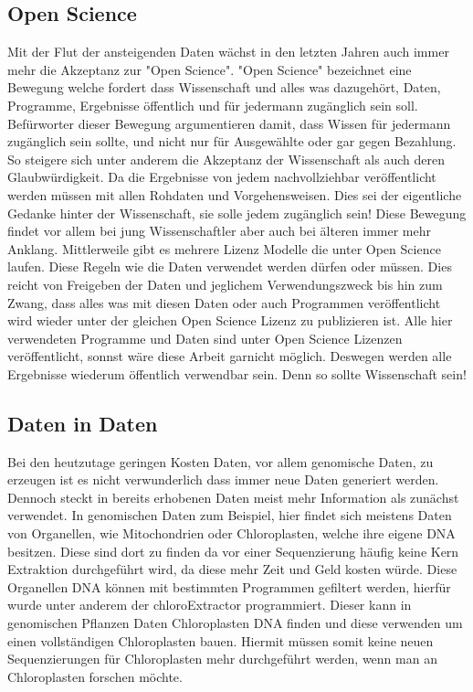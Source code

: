 \documentclass{scrartcl}
\begin{document}
\subsection{Open Science}
\label{sec-1-3}
Mit der Flut der ansteigenden Daten wächst in den letzten Jahren auch immer mehr die Akzeptanz zur "Open Science".
"Open Science" bezeichnet eine Bewegung welche fordert dass Wissenschaft und alles was dazugehört, Daten, Programme, Ergebnisse öffentlich und für jedermann 
zugänglich sein soll. Befürworter dieser Bewegung argumentieren damit, dass Wissen für jedermann zugänglich sein sollte, und nicht nur für Ausgewählte oder gar
gegen Bezahlung. So steigere sich unter anderem die Akzeptanz der Wissenschaft als auch deren Glaubwürdigkeit. Da die Ergebnisse von jedem nachvollziehbar 
veröffentlicht werden müssen mit allen Rohdaten und Vorgehensweisen. Dies sei der eigentliche Gedanke hinter der Wissenschaft, sie solle jedem zugänglich sein!
Diese Bewegung findet vor allem bei jung Wissenschaftler aber auch bei älteren immer mehr Anklang. Mittlerweile gibt es mehrere Lizenz Modelle die unter
Open Science laufen. Diese Regeln wie die Daten verwendet werden dürfen oder müssen. Dies reicht von Freigeben der Daten und jeglichem Verwendungszweck bis hin
zum Zwang, dass alles was mit diesen Daten oder auch Programmen veröffentlicht wird wieder unter der gleichen Open Science Lizenz zu publizieren ist.
Alle hier verwendeten Programme und Daten sind unter Open Science Lizenzen veröffentlicht, sonnst wäre diese Arbeit garnicht möglich. 
Deswegen werden alle Ergebnisse wiederum öffentlich verwendbar sein. Denn so sollte Wissenschaft sein!  

\subsection{Daten in Daten}
\label{sec-1-4}
Bei den heutzutage geringen Kosten Daten, vor allem genomische Daten, zu erzeugen ist es nicht verwunderlich dass immer neue Daten generiert werden.
Dennoch steckt in bereits erhobenen Daten meist mehr Information als zunächst verwendet. In genomischen Daten zum Beispiel, hier findet sich meistens Daten 
von Organellen, wie Mitochondrien oder Chloroplasten, welche ihre eigene DNA besitzen. Diese sind dort zu finden da vor einer Sequenzierung häufig keine 
Kern Extraktion durchgeführt wird, da diese mehr Zeit und Geld kosten würde. Diese Organellen DNA können mit bestimmten Programmen gefiltert werden, hierfür 
wurde unter anderem der chloroExtractor programmiert. Dieser kann in genomischen Pflanzen Daten Chloroplasten DNA finden und diese verwenden um einen vollständigen
Chloroplasten bauen. Hiermit müssen somit keine neuen Sequenzierungen für Chloroplasten mehr durchgeführt werden, wenn man an Chloroplasten forschen möchte.
\end{document}
